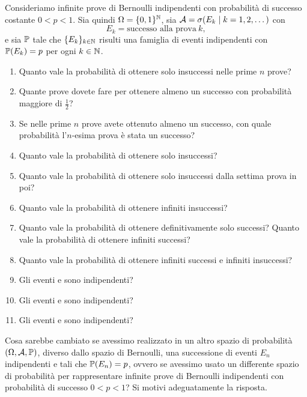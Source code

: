 
Consideriamo infinite prove di Bernoulli indipendenti con probabilità di successo costante $0< p< 1$. Sia quindi $\Omega =\{0,1\}^{\mathbb{N}}$, sia $\mathcal{A} =\sigma (E_{k} \mid k=1,2,\dots)$ con
\begin{equation*}
	E_{k} =\text{successo alla prova} \ k,
\end{equation*}
e sia $\mathbb{P}$ tale che $\{E_{k}\}_{k\in \mathbb{N}}$ risulti una famiglia di eventi indipendenti con $\mathbb{P}(E_{k}) =p$ per ogni $k\in \mathbb{N}$.
\begin{enumerate}
	\item Quanto vale la probabilità di ottenere solo insuccessi nelle prime $n$ prove?
	\item Quante prove dovete fare per ottenere almeno un successo con probabilità maggiore di $\frac{1}{2}$?
	\item Se nelle prime $n$ prove avete ottenuto almeno un successo, con quale probabilità l'$n$-esima prova è stata un successo?
	\item Quanto vale la probabilità di ottenere solo insuccessi?
	\item Quanto vale la probabilità di ottenere solo insuccessi dalla settima prova in poi?
	\item Quanto vale la probabilità di ottenere infiniti insuccessi?
	\item Quanto vale la probabilità di ottenere definitivamente solo successi? Quanto vale la probabilità di ottenere infiniti successi?
	\item Quanto vale la probabilità di ottenere infiniti successi e infiniti insuccessi?
	\item Gli eventi  e  sono indipendenti?
	\item Gli eventi  e  sono indipendenti?
	\item Gli eventi  e  sono indipendenti?
\end{enumerate}
Cosa sarebbe cambiato se avessimo realizzato in un altro spazio di probabilità $(\Omega,\mathcal{A},\mathbb{P})$, diverso dallo spazio di Bernoulli, una successione di eventi $E_{n}$ indipendenti e tali che $\mathbb{P}(E_{n}) =p$, ovvero se avessimo usato un differente spazio di probabilità per rappresentare infinite prove di Bernoulli indipendenti con probabilità di successo $0< p< 1$? Si motivi adeguatamente la risposta.

